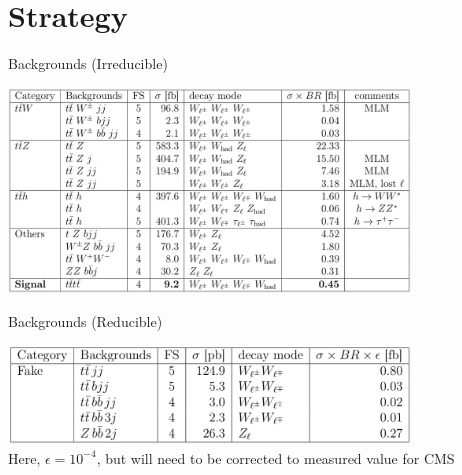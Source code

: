 \documentclass[english,aspectratio=169]{beamer}
\begin{document}
\section{Strategy}
\begin{frame}{Backgrounds (Irreducible)}
  \begin{center}
    \includegraphics[width=0.8\textwidth]{figures/irreducible-backgrounds}
  \end{center}
\end{frame}

\begin{frame}{Backgrounds (Reducible)}
  \begin{center}
    \includegraphics[width=0.8\textwidth]{figures/reducible-backgrounds}
  \\
  Here, $\epsilon=10^{-4}$, but will need to be corrected to measured value for CMS
  \end{center}
\end{frame}
\end{document}
